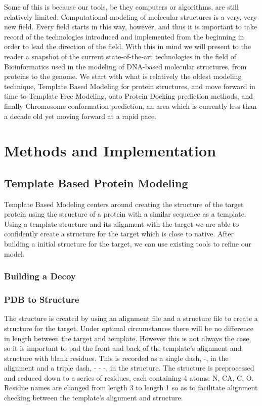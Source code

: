 \documentclass{article}
\begin{document}
Some of this is because our tools, be they computers or algorithms, are still relatively limited.  Computational modeling of molecular structures is a very, very new field.  Every field starts in this way, however, and thus it is important to take record of the technologies introduced and implemented from the beginning in order to lead the direction of the field. With this in mind we will present to the reader a snapshot of the current state-of-the-art technologies in the field of Bioinformatics used in the modeling of DNA-based molecular structures, from proteins to the genome. We start with what is relatively the oldest modeling technique, Template Based Modeling for protein structures, and move forward in time to Template Free Modeling, onto Protein Docking prediction methods, and finally Chromosome conformation prediction, an area which is currently less than a decade old yet moving forward at a rapid pace.


\section{Methods and Implementation}

\subsection{Template Based Protein Modeling}

Template Based Modeling centers around creating the structure of the target protein using the structure of a protein with a similar sequence as a template. Using a template structure and its alignment with the target we are able to confidently create a structure for the target which is close to native. After building a initial structure for the target, we can use existing tools to refine our model.

\subsubsection{Building a Decoy}

\subsubsection*{PDB to Structure}

The structure is created by using an alignment file and a structure file to create a structure for the target. Under optimal circumstances there will be no difference in length between the target and template. However this is not always the case, so it is important to pad the front and back of the template's alignment and structure with blank residues. This is recorded as a single dash, -, in the alignment and a triple dash, - - -, in the structure. The structure is preprocessed and reduced down to a series of residues, each containing 4 atoms: N, CA, C, O. Residue names are changed from length 3 to length 1 so as to facilitate alignment checking between the template's alignment and structure.
\end{document}
